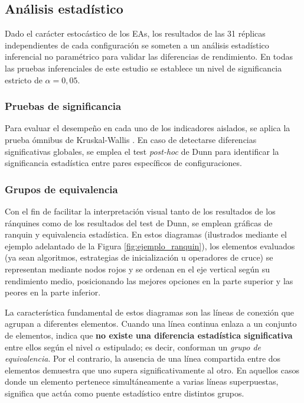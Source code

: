 \subsection{Análisis estadístico}

Dado el carácter estocástico de los EAs, los resultados de las 31 réplicas independientes \cite{granado2020multiobjective} de cada configuración se someten a un análisis estadístico inferencial no paramétrico para validar las diferencias de rendimiento. En todas las pruebas inferenciales de este estudio se establece un nivel de significancia estricto de $\alpha = 0{,}05$.

\subsubsection{Pruebas de significancia}

Para evaluar el desempeño en cada uno de los indicadores aislados, se aplica la prueba ómnibus de Kruskal-Wallis \cite{kruskal1952use}. En caso de detectarse diferencias significativas globales, se emplea el test \textit{post-hoc} de Dunn \cite{dunn1964multiple} para identificar la significancia estadística entre pares específicos de configuraciones.

\subsubsection{Grupos de equivalencia}

Con el fin de facilitar la interpretación visual tanto de los resultados de los ránquines como de los resultados del test de Dunn, se emplean gráficas de ranquin y equivalencia estadística. En estos diagramas (ilustrados mediante el ejemplo adelantado de la Figura \ref{fig:ejemplo_ranquin}), los elementos evaluados (ya sean algoritmos, estrategias de inicialización u operadores de cruce) se representan mediante nodos rojos y se ordenan en el eje vertical según su rendimiento medio, posicionando las mejores opciones en la parte superior y las peores en la parte inferior. 

La característica fundamental de estos diagramas son las líneas de conexión que agrupan a diferentes elementos. Cuando una línea continua enlaza a un conjunto de elementos, indica que \textbf{no existe una diferencia estadística significativa} entre ellos según el nivel $\alpha$ estipulado; es decir, conforman un \textit{grupo de equivalencia}. Por el contrario, la ausencia de una línea compartida entre dos elementos demuestra que uno supera significativamente al otro. En aquellos casos donde un elemento pertenece simultáneamente a varias líneas superpuestas, significa que actúa como puente estadístico entre distintos grupos.

